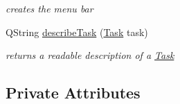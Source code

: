 \begin{DoxyCompactItemize}
\begin{DoxyCompactList}\small\item\em creates the menu bar \end{DoxyCompactList}\item 
\hypertarget{class_main_window_a4aacfe6bb51e21018d6d26e6146ba1f7}{}Q\+String \hyperlink{class_main_window_a4aacfe6bb51e21018d6d26e6146ba1f7}{describe\+Task} (\hyperlink{struct_task}{Task} task)\label{class_main_window_a4aacfe6bb51e21018d6d26e6146ba1f7}

\begin{DoxyCompactList}\small\item\em returns a readable description of a \hyperlink{struct_task}{Task} \end{DoxyCompactList}\end{DoxyCompactItemize}
\subsection*{Private Attributes}
